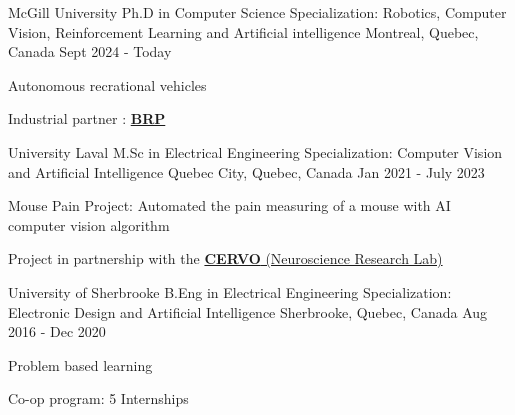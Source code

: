 

\begin{cventries}

    \cventry
     {McGill University} %
     {Ph.D in Computer Science \newline Specialization: Robotics, Computer Vision, \newline Reinforcement Learning and Artificial intelligence} %
     {Montreal, Quebec, Canada} %
     {Sept 2024 - Today} %
     {
       \begin{cvitems} %
         \item {Autonomous recrational vehicles }
         \item {Industrial partner : \href{http://www.brp.com/en/}{\textbf{BRP}}}
       \end{cvitems}
     }
    

  \cventry
    {University Laval} %
    {M.Sc in Electrical Engineering \newline Specialization: Computer Vision and Artificial Intelligence } %
    {Quebec City, Quebec, Canada} %
    {Jan 2021 - July 2023} %
    {
      \begin{cvitems} %
        \item {Mouse Pain Project: Automated the pain measuring of a mouse with AI computer vision algorithm}
        \item {Project in partnership with the  \href{https://cervo.ulaval.ca/en}{\textbf{CERVO} (Neuroscience Research Lab)}} 
      \end{cvitems}
    }
    
  \cventry
    {University of Sherbrooke} %
    {B.Eng in Electrical Engineering  \newline Specialization: Electronic Design and Artificial Intelligence} %
    {Sherbrooke, Quebec, Canada} %
    {Aug 2016 - Dec 2020} %
    {
      \begin{cvitems} %
        \item {Problem based learning}
        \item {Co-op program: 5 Internships} 
      \end{cvitems}
    }
    
\end{cventries}
